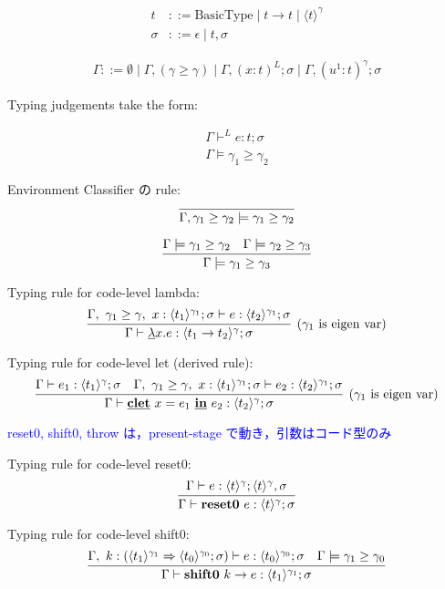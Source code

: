 \documentclass[10pt,a4j]{jarticle}
\newcommand\blue[1]{\textcolor{blue}{#1}}
\newcommand\Resetz{\textbf{reset0}}
\newcommand\Shiftz{\textbf{shift0}}
\newcommand\resetz[1]{\Resetz~{#1}}
\newcommand\shiftz[2]{\Shiftz~{#1}\to{#2}}
\newcommand\cfun[2]{\underline{\lambda}{#1}.{#2}}
\newcommand\cLet{\underline{\textbf{clet}}}
\newcommand\cIn{\underline{\textbf{in}}}
\newcommand\clet[3]{\cLet~{#1}={#2}~\cIn~{#3}}
\newcommand\codeT[2]{\langle{#1}\rangle^{#2}}
\newcommand\contT[2]{({#1} \Rightarrow {#2})}
\newcommand\ord{\ge}
\newcommand\ooi[1]{\blue{{#1}}}
\theoremstyle{break}
\begin{document}
\begin{align*}
  t & ::= \textrm{BasicType} \mid t \to t \mid \codeT{t}{\gamma} \\
  \sigma & ::= \epsilon \mid t, \sigma
\end{align*}

\begin{align*}
  \Gamma ::= \emptyset
  \mid \Gamma, (\gamma \ord \gamma)
  \mid \Gamma, (x : t)^{L} ; \sigma
  \mid \Gamma, (u^1 : t)^{\gamma} ; \sigma
\end{align*}

Typing judgements take the form:

\begin{align*}
  \Gamma \vdash^{L} e : t ; \sigma \\
  \Gamma \models \gamma_1 \ord \gamma_2
\end{align*}

Environment Classifier の rule:
\[
  \infer
  {\Gamma, \gamma_1 \ord \gamma_2 \models \gamma_1 \ord \gamma_2}
  {}
\]

\[
  \infer
  {\Gamma \models \gamma_1 \ord \gamma_3}
  {\Gamma \models \gamma_1 \ord \gamma_2 & \Gamma \models \gamma_2 \ord \gamma_3}
\]



Typing rule for code-level lambda:
\[
  \infer[(\gamma_1~\text{is eigen var})]
  {\Gamma \vdash \cfun{x}{e} : \codeT{t_1\to t_2}{\gamma} ; \sigma}
  {\Gamma,~\gamma_1 \ord \gamma,~x:\codeT{t_1}{\gamma_1} ; \sigma \vdash e
    : \codeT{t_2}{\gamma_1}; \sigma}
\]

Typing rule for code-level let (derived rule):
\[
  \infer[(\gamma_1~\text{is eigen var})]
  {\Gamma \vdash \clet{x}{e_1}{e_2} : \codeT{t_2}{\gamma} ; \sigma}
  {\Gamma \vdash e_1 : \codeT{t_1}{\gamma} ; \sigma
    &\Gamma,~\gamma_1 \ord \gamma,~x:\codeT{t_1}{\gamma_1} ; \sigma \vdash
    e_2 : \codeT{t_2}{\gamma_1} ; \sigma
  }
\]

\ooi{reset0, shift0, throw は，present-stage で動き，引数はコード型のみ}


Typing rule for code-level reset0:
\[
  \infer{\Gamma \vdash \resetz{e} : \codeT{t}{\gamma} ; \sigma}
  {\Gamma \vdash e : \codeT{t}{\gamma} ; \codeT{t}{\gamma}, \sigma}
\]

Typing rule for code-level shift0:
\[
  \infer{\Gamma \vdash \shiftz{k}{e} : \codeT{t_1}{\gamma_1} ; \sigma}
  {\Gamma,~k:\contT{\codeT{t_1}{\gamma_1}}{\codeT{t_0}{\gamma_0} ; \sigma}
    \vdash e : \codeT{t_0}{\gamma_0} ; \sigma
    & \Gamma \models \gamma_1 \ord \gamma_0
  }
\]
\end{document}
